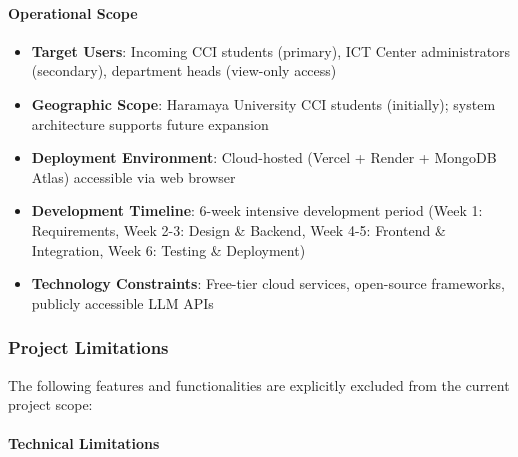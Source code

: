 \documentclass[12pt, a4paper]{article}
\begin{document}
\paragraph{Operational Scope}

\begin{itemize}[leftmargin=1.5em, itemsep=3pt]
    \item \textbf{Target Users}: Incoming CCI students (primary), ICT Center administrators (secondary), department heads (view-only access)
    \item \textbf{Geographic Scope}: Haramaya University CCI students (initially); system architecture supports future expansion
    \item \textbf{Deployment Environment}: Cloud-hosted (Vercel + Render + MongoDB Atlas) accessible via web browser
    \item \textbf{Development Timeline}: 6-week intensive development period (Week 1: Requirements, Week 2-3: Design \& Backend, Week 4-5: Frontend \& Integration, Week 6: Testing \& Deployment)
    \item \textbf{Technology Constraints}: Free-tier cloud services, open-source frameworks, publicly accessible LLM APIs
\end{itemize}

\subsubsection*{Project Limitations}

The following features and functionalities are explicitly excluded from the current project scope:

\paragraph{Technical Limitations}
\end{document}

